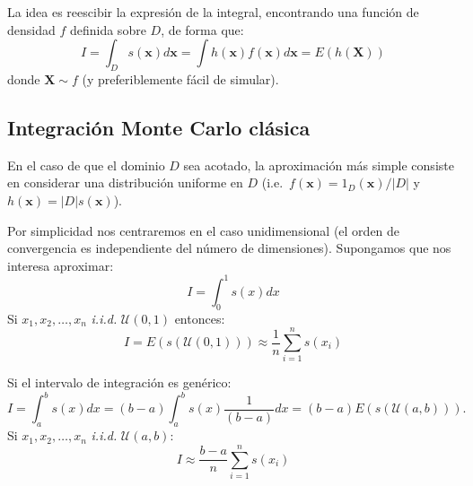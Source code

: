 \documentclass[
]{book}
\theoremstyle{break}
\theoremstyle{nonumberplain}
\begin{document}
La idea es reescibir la expresión de la integral, encontrando una función de densidad \(f\) definida sobre \(D\), de forma que:
\[I = \int _D s(\mathbf{x}) d \mathbf{x} = \int h(\mathbf{x})f(\mathbf{x}) d \mathbf{x} = E\left( h(\mathbf{X}) \right)\]
donde \(\mathbf{X} \sim f\) (y preferiblemente fácil de simular).

\hypertarget{integraciuxf3n-monte-carlo-cluxe1sica}{%
\subsection{Integración Monte Carlo clásica}\label{integraciuxf3n-monte-carlo-cluxe1sica}}

En el caso de que el dominio \(D\) sea acotado, la aproximación más simple consiste en considerar una distribución uniforme en \(D\) (i.e.~\(f(\mathbf{x})=1_D(\mathbf{x})/|D|\) y \(h(\mathbf{x}) = |D|s(\mathbf{x})\)).

Por simplicidad nos centraremos en el caso unidimensional (el orden de convergencia es independiente del número de dimensiones).
Supongamos que nos interesa aproximar:
\[I = \int_0^1 s(x) dx\]
Si \(x_1,x_2,\ldots ,x_n\) \emph{i.i.d.} \(\mathcal{U}(0, 1)\)
entonces:
\[I = E\left( s\left( \mathcal{U}(0, 1) \right) \right)
\approx \frac{1}{n}\sum\limits_{i=1}^n s\left( x_i\right)\]

Si el intervalo de integración es genérico:
\[I = \int_a^b s(x) dx = 
(b-a)\int_a^b s(x) \frac1{(b-a)}dx = 
(b-a)E\left( s\left( \mathcal{U}(a, b) \right) \right).\]
Si \(x_1,x_2,\ldots ,x_n\) \emph{i.i.d.} \(\mathcal{U}(a, b)\):
\[I \approx \frac{b-a}{n}\sum\limits_{i=1}^n s\left( x_i\right)\]
\end{document}
